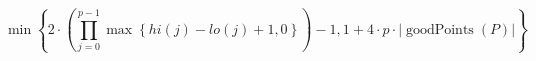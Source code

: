 \[\min\left\{ 2 \cdot \left(\prod_{j=0}^{p-1} \max\left\{ hi\left(j\right) - lo\left(j\right) + 1, 0 \right\}\right) - 1, 1 + 4 \cdot p \cdot \left|\operatorname{goodPoints}\left(P\right)\right| \right\}\]
